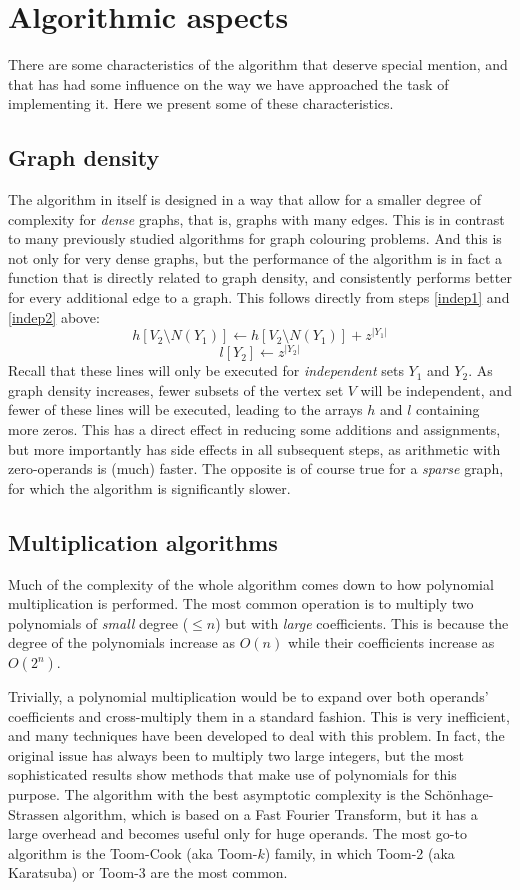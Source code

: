 \documentclass{cslthse-msc}
\begin{document}
\section{Algorithmic aspects}
There are some characteristics of the algorithm that deserve special mention, and that has had some influence on the way we have approached the task of implementing it. Here we present some of these characteristics.

\subsection{Graph density}\label{graphdensity}
The algorithm in itself is designed in a way that allow for a smaller degree of complexity for \emph{dense} graphs, that is, graphs with many edges. This is in contrast to many previously studied algorithms for graph colouring problems. And this is not only for very dense graphs, but the performance of the algorithm is in fact a function that is directly related to graph density, and consistently performs better for every additional edge to a graph. This follows directly from steps \ref{indep1} and \ref{indep2} above:
\[ h[V_2 \setminus N(Y_1)] \leftarrow h[V_2 \setminus N(Y_1)] + z^{|Y_1|} \]
\[ l[Y_2] \leftarrow z^{|Y_2|} \]
Recall that these lines will only be executed for \emph{independent} sets $Y_1$ and $Y_2$. As graph density increases, fewer subsets of the vertex set $V$ will be independent, and fewer of these lines will be executed, leading to the arrays $h$ and $l$ containing more zeros. This has a direct effect in reducing some additions and assignments, but more importantly has side effects in all subsequent steps, as arithmetic with zero-operands is (much) faster. The opposite is of course true for a \emph{sparse} graph, for which the algorithm is significantly slower.

\subsection{Multiplication algorithms}
Much of the complexity of the whole algorithm comes down to how polynomial multiplication is performed. The most common operation is to multiply two polynomials of \emph{small} degree ($\leq n$) but with \emph{large} coefficients. This is because the degree of the polynomials increase as $O(n)$ while their coefficients increase as $O(2^n)$.

Trivially, a polynomial multiplication would be to expand over both operands' coefficients and cross-multiply them in a standard fashion. This is very inefficient, and many techniques have been developed to deal with this problem. In fact, the original issue has always been to multiply two large integers, but the most sophisticated results show methods that make use of polynomials for this purpose. The algorithm with the best asymptotic complexity is the Schönhage-Strassen algorithm, which is based on a Fast Fourier Transform, but it has a large overhead and becomes useful only for huge operands. The most go-to algorithm is the Toom-Cook (aka Toom-$k$) family, in which Toom-2 (aka Karatsuba) or Toom-3 are the most common.
\end{document}
